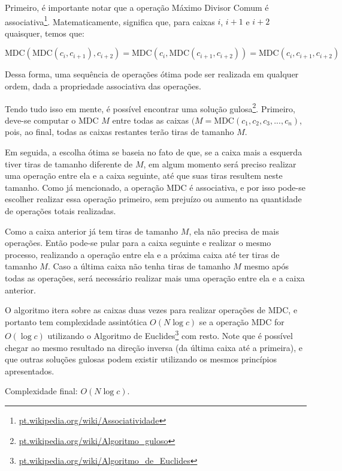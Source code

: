 Primeiro, é importante notar que a operação Máximo Divisor Comum é associativa\footnote{\url{pt.wikipedia.org/wiki/Associatividade}}. Matematicamente, significa que, para caixas $i$, $i+1$ e $i+2$ quaisquer, temos que: 

\[\text{MDC}(\text{MDC}(c_{i}, c_{i+1}), c_{i+2}) = \text{MDC}(c_{i}, \text{MDC}(c_{i+1}, c_{i+2})) = \text{MDC}(c_{i}, c_{i+1}, c_{i+2})\]

Dessa forma, uma sequência de operações ótima pode ser realizada em qualquer ordem, dada a propriedade associativa das operações.

Tendo tudo isso em mente, é possível encontrar uma solução gulosa\footnote{\url{pt.wikipedia.org/wiki/Algoritmo_guloso}}. Primeiro, deve-se computar o MDC $M$ entre todas as caixas $(M = \text{MDC}(c_{1}, c_{2}, c_{3}, ..., c_{n})$, pois, ao final, todas as caixas restantes terão tiras de tamanho $M$.

Em seguida, a escolha ótima se baseia no fato de que, se a caixa mais a esquerda tiver tiras de tamanho diferente de $M$, em algum momento será preciso realizar uma operação entre ela e a caixa seguinte, até que suas tiras resultem neste tamanho. Como já mencionado, a operação MDC é associativa, e por isso pode-se escolher realizar essa operação primeiro, sem prejuízo ou aumento na quantidade de operações totais realizadas.

Como a caixa anterior já tem tiras de tamanho $M$, ela não precisa de mais operações. Então pode-se pular para a caixa seguinte e realizar o mesmo processo, realizando a operação entre ela e a próxima caixa até ter tiras de tamanho $M$. Caso a última caixa não tenha tiras de tamanho $M$ mesmo após todas as operações, será necessário realizar mais uma operação entre ela e a caixa anterior.

O algoritmo itera sobre as caixas duas vezes para realizar operações de MDC, e portanto tem complexidade assintótica $O(N \log c)$ se a operação MDC for $O(\log c)$ utilizando o Algoritmo de Euclides\footnote{\url{pt.wikipedia.org/wiki/Algoritmo_de_Euclides}} com resto. Note que é possível chegar ao mesmo resultado na direção inversa (da última caixa até a primeira), e que outras soluções gulosas podem existir utilizando os mesmos princípios apresentados.

Complexidade final: $O(N \log c)$.

